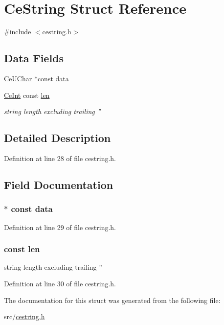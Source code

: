 \hypertarget{struct___ce_string}{
\section{CeString Struct Reference}
\label{struct___ce_string}
}


{\ttfamily \#include $<$cestring.h$>$}\subsection*{Data Fields}
\begin{DoxyCompactItemize}
\item 
\hyperlink{cetypes_8h_a3a94319866313b53b54825af2ba77e8d}{CeUChar} $\ast$const \hyperlink{struct___ce_string_a5d1597aa704055227e587c70976f9edc}{data}
\item 
\hyperlink{cetypes_8h_aced3fca6c74c98a0a7c07757af07abca}{CeInt} const \hyperlink{struct___ce_string_a441d506b9271f3d6192d9973d33b97bb}{len}
\begin{DoxyCompactList}\small\item\em string length excluding trailing '' \item\end{DoxyCompactList}\end{DoxyCompactItemize}


\subsection{Detailed Description}


Definition at line 28 of file cestring.h.

\subsection{Field Documentation}
\hypertarget{struct___ce_string_a5d1597aa704055227e587c70976f9edc}{
\subsubsection[{data}]{$\ast$ const {\bf data}}}
\label{struct___ce_string_a5d1597aa704055227e587c70976f9edc}


Definition at line 29 of file cestring.h.\hypertarget{struct___ce_string_a441d506b9271f3d6192d9973d33b97bb}{
\subsubsection[{len}]{ const {\bf len}}}
\label{struct___ce_string_a441d506b9271f3d6192d9973d33b97bb}


string length excluding trailing '' 

Definition at line 30 of file cestring.h.

The documentation for this struct was generated from the following file:\begin{DoxyCompactItemize}
\item 
src/\hyperlink{cestring_8h}{cestring.h}\end{DoxyCompactItemize}
